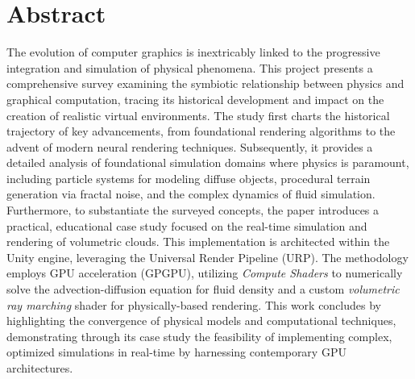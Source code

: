 \section*{Abstract}

The evolution of computer graphics is inextricably linked to the progressive integration and simulation of physical phenomena. This project presents a comprehensive survey examining the symbiotic relationship between physics and graphical computation, tracing its historical development and impact on the creation of realistic virtual environments. The study first charts the historical trajectory of key advancements, from foundational rendering algorithms to the advent of modern neural rendering techniques. Subsequently, it provides a detailed analysis of foundational simulation domains where physics is paramount, including particle systems for modeling diffuse objects, procedural terrain generation via fractal noise, and the complex dynamics of fluid simulation. Furthermore, to substantiate the surveyed concepts, the paper introduces a practical, educational case study focused on the real-time simulation and rendering of volumetric clouds. This implementation is architected within the Unity engine, leveraging the Universal Render Pipeline (URP). The methodology employs GPU acceleration (GPGPU), utilizing \textit{Compute Shaders} to numerically solve the advection-diffusion equation for fluid density and a custom \textit{volumetric ray marching} shader for physically-based rendering. This work concludes by highlighting the convergence of physical models and computational techniques, demonstrating through its case study the feasibility of implementing complex, optimized simulations in real-time by harnessing contemporary GPU architectures.
